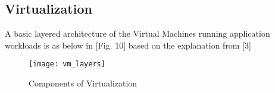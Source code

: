 \subsection{Virtualization}

A basic layered architecture of the Virtual Machines running application workloads is as below in [Fig. 10] based on the explanation from [3]

\begin{figure}
    \centering
    \texttt{[image: vm\_layers]}
    \label{fig:figure8}
    \caption{Components of Virtualization}
\end{figure}
